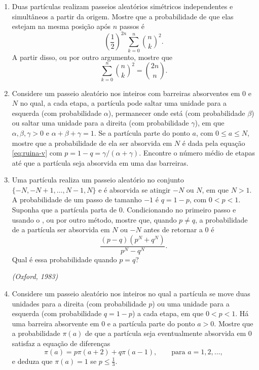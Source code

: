 \documentclass[12pt,portuguese]{article}
\theoremstyle{definition}
\theoremstyle{plainexercise}
\theoremstyle{starredexercise}
\theoremstyle{definition}
\begin{document}
\providecommand{\starredproblem}{%
\refstepcounter{enumi}\llap{\textasteriskcentered\,}\arabic{enumi}.}

\begin{enumerate}[label={\arabic*.}]
\item\label{prob:duas-particulas-mesma-posicao}
Duas partículas realizam passeios aleatórios simétricos independentes e
simultâneos a partir da origem. Mostre que a probabilidade de que elas estejam
na mesma posição após $n$ passos é
\[
\left(\frac{1}{2}\right)^{2n}\sum_{k=0}^{n}\binom{n}{k}^2.
\]
A partir disso, ou por outro argumento, mostre que
\[
\sum_{k=0}^{n}\binom{n}{k}^2=\binom{2n}{n}.
\]

\item\label{prob:passeio-com-permanencia}
Considere um passeio aleatório nos inteiros com barreiras absorventes em $0$ e
$N$ no qual, a cada etapa, a partícula pode saltar uma unidade para a esquerda
(com probabilidade $\alpha$), permanecer onde está (com probabilidade $\beta$)
ou saltar uma unidade para a direita (com probabilidade $\gamma$), em que
$\alpha,\beta,\gamma>0$ e $\alpha+\beta+\gamma=1$. Se a partícula parte do
ponto $a$, com $0\leqslant a\leqslant N$, mostre que a probabilidade de ela ser
absorvida em $N$ é dada pela equação \eqref{eq:ruina-v} com
$p=1-q=\gamma/(\alpha+\gamma)$. Encontre o número médio de etapas até que a
partícula seja absorvida em uma das barreiras.

\item\label{prob:absorcao-antes-retorno}
Uma partícula realiza um passeio aleatório no conjunto
$\{-N,-N+1,\ldots,N-1,N\}$ e é absorvida se atingir $-N$ ou $N$, em que $N>1$.
A probabilidade de um passo de tamanho $-1$ é $q=1-p$, com $0<p<1$. Suponha
que a partícula parta de $0$. Condicionando no primeiro passo e usando o
, ou por outro método, mostre que, quando
$p\neq q$, a probabilidade de a partícula ser absorvida em $N$ ou $-N$ antes de
retornar a $0$ é
\[
\frac{(p-q)(p^N+q^N)}{p^N-q^N}.
\]
Qual é essa probabilidade quando $p=q$?

\smallskip
\noindent\emph{(Oxford, 1983)}

\item\label{prob:passeio-passos-2-menos-1}
Considere um passeio aleatório nos inteiros no qual a partícula se move duas
unidades para a direita (com probabilidade $p$) ou uma unidade para a esquerda
(com probabilidade $q=1-p$) a cada etapa, em que $0<p<1$. Há uma barreira
absorvente em $0$ e a partícula parte do ponto $a>0$. Mostre que a
probabilidade $\pi(a)$ de que a partícula seja eventualmente absorvida em $0$
satisfaz a equação de diferenças
\[
\pi(a)=p\pi(a+2)+q\pi(a-1), \qquad\text{para } a=1,2,\ldots,
\]
e deduza que $\pi(a)=1$ se $p\leqslant\tfrac{1}{3}$.


\end{enumerate}
\end{document}
